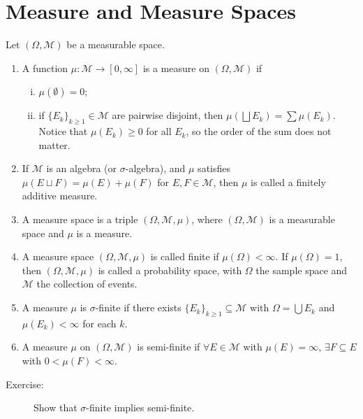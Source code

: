 \documentclass[9pt]{extarticle}
\begin{document}
  \section{Measure and Measure Spaces}%
  Let $(\Omega,\mathcal{M})$ be a measurable space.
  \begin{enumerate}[(1)]
    \item A function $\mu: \mathcal{M}\rightarrow [0,\infty]$ is a measure on $(\Omega,\mathcal{M})$ if
      \begin{enumerate}[(i)]
        \item $\mu(\emptyset) = 0$;
        \item if $\{E_k\}_{k\geq 1}\in \mathcal{M}$ are pairwise disjoint, then $\mu \left(\bigsqcup E_k\right) = \sum \mu(E_k)$. Notice that $\mu(E_k)\geq 0$ for all $E_k$, so the order of the sum does not matter.
      \end{enumerate}
    \item If $\mathcal{M}$ is an algebra (or $\sigma$-algebra), and $\mu$ satisfies $\mu(E\sqcup F) = \mu(E) + \mu(F)$ for $E,F\in \mathcal{M}$, then $\mu$ is called a finitely additive measure.
    \item A measure space is a triple $(\Omega,\mathcal{M},\mu)$, where $(\Omega,\mathcal{M})$ is a measurable space and $\mu$ is a measure.
    \item A measure space $(\Omega,\mathcal{M},\mu)$ is called finite if $\mu(\Omega) < \infty$. If $\mu(\Omega) = 1$, then $(\Omega,\mathcal{M},\mu)$ is called a probability space, with $\Omega$ the sample space and $\mathcal{M}$ the collection of events.
    \item A measure $\mu$ is $\sigma$-finite if there exists $\{E_k\}_{k\geq 1}\subseteq \mathcal{M}$ with $\Omega = \bigcup E_k$ and $\mu(E_k) < \infty$ for each $k$.
    \item A measure $\mu$ on $(\Omega,\mathcal{M})$ is semi-finite if $\forall E\in \mathcal{M}$ with $\mu(E) = \infty$, $\exists F\subseteq E$ with $0 < \mu(F) < \infty$.
  \end{enumerate}
  \begin{description}
    \item[Exercise:] Show that $\sigma$-finite implies semi-finite.
  \end{description}
\end{document}

